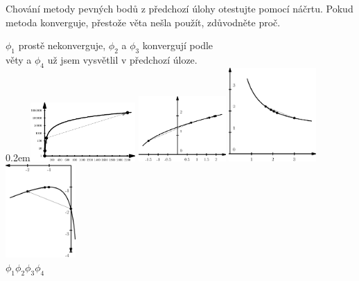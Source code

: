 \documentclass[12pt]{article}                   %
\begin{document}
\begin{priklad}
	Chování metody pevných bodů z předchozí úlohy otestujte pomocí náčrtu. Pokud metoda konverguje, přestože věta nešla použít, zdůvodněte proč.

	\begin{reseni}
		$\phi_1$ prostě nekonverguje, $\phi_2$ a $\phi_3$ konvergují podle\\
		věty a $\phi_4$ už jsem vysvětlil v předchozí úloze.\\[-4em]
		
		\noindent\raise 0.2em\hbox{\includegraphics[width=0.3\textwidth]{NDU4_phi1.eps}}
		\includegraphics[width=0.25\textwidth]{NDU4_phi2.eps}
		\includegraphics[width=0.25\textwidth]{NDU4_phi3.eps}\hspace{-2em}
		\includegraphics[width=0.2\textwidth]{NDU4_phi4.eps}\\[-2em]

		\noindent\hspace{0.15\textwidth}$\phi_1$\hspace{0.23\textwidth}$\phi_2$\hspace{0.25\textwidth}$\phi_3$\hspace{0.23\textwidth}$\phi_4$
	\end{reseni}
\end{priklad}
\end{document}
